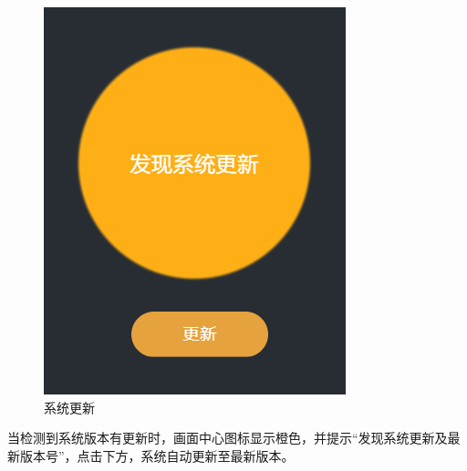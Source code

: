 \begin{figure}[htb]
{\begin{minipage}[t]{0.3\linewidth}
		\includegraphics[width=\linewidth]{screen/3-29.png}
	\end{minipage}}
	\caption{系统更新}
	\label{fig:系统更新}
\end{figure}

当检测到系统版本有更新时，画面中心图标显示橙色，并提示“发现系统更新及最新版本号”，点击下方，系统自动更新至最新版本。

